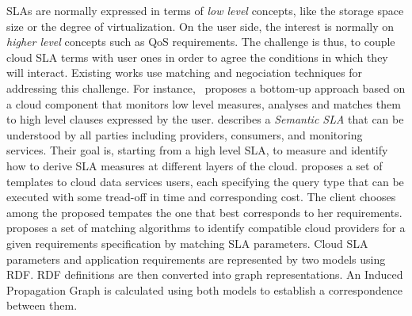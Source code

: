 


SLAs are normally expressed in terms of \textit{low level} concepts, like the storage space size  or the degree of virtualization. 
On the user side, the interest is normally on \textit{higher level} concepts such as QoS requirements.
The challenge is thus, to couple cloud SLA terms with user ones in order to agree the conditions in which they will interact. Existing works use matching and negociation techniques for addressing this challenge.  
For instance,~\cite{5547150} 
proposes a bottom-up approach based on a cloud component that monitors low level measures, analyses and matches them to high level clauses expressed by the user.
  \cite{Dastjerdi:2012:DOA:2275356.2275360} describes a \textit{Semantic SLA} that can be understood by all parties including providers, consumers, and monitoring services.
Their goal is, starting from a high level SLA, to measure and identify how to derive SLA measures  at different layers of the cloud.  \cite{Ortiz:2013:VPS:2486767.2486772}
  proposes a set of templates to  cloud data services users, each specifying the query type that can be executed with some tread-off in time and corresponding cost.  The client  chooses among the proposed tempates the one that best corresponds   to her requirements. \cite{6141307} proposes a set of matching algorithms to identify compatible cloud providers for a given requirements specification by matching SLA parameters. Cloud SLA parameters and application requirements are represented by two models using RDF. RDF definitions are then converted into graph representations. An Induced Propagation Graph is calculated using both models to establish a correspondence between them.


